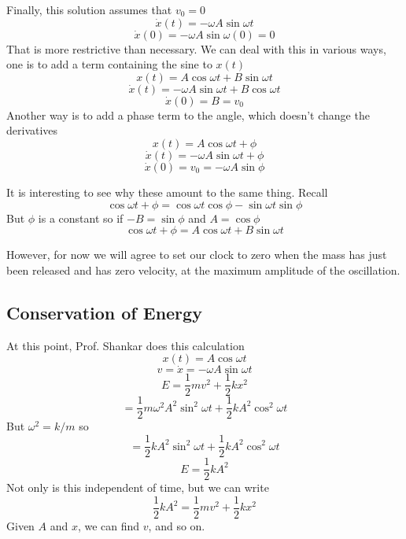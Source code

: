 \documentclass[11pt, oneside]{article}
\begin{document}
Finally, this solution assumes that $v_0 = 0$
\[ \dot{x}(t) = - \omega A \sin \omega t \]
\[ \dot{x}(0) = - \omega A \sin \omega (0) = 0 \]
That is more restrictive than necessary.  We can deal with this in various ways, one is to add a term containing the sine to $x(t)$
\[ x(t) =  A \cos \omega t + B \sin \omega t\]
\[ \dot{x}(t) =  - \omega A \sin \omega t + B \cos \omega t\]
\[ \dot{x}(0) = B = v_0 \]
Another way is to add a phase term to the angle, which doesn't change the derivatives
\[ x(t) =  A \cos \omega t + \phi \]
\[ \dot{x}(t) = - \omega A \sin \omega t + \phi \]
\[ \dot{x}(0) = v_0 = - \omega A \sin \phi \]

It is interesting to see why these amount to the same thing.  Recall
\[ \cos \omega t + \phi = \cos \omega t \cos \phi - \sin \omega t \sin \phi \]
But $\phi$ is a constant so if $-B = \sin \phi$ and $A = \cos \phi$
\[ \cos \omega t + \phi = A \cos \omega t + B \sin \omega t \]

However, for now we will agree to set our clock to zero when the mass has just been released and has zero velocity, at the maximum amplitude of the oscillation.

\subsection*{Conservation of Energy}
At this point, Prof. Shankar does this calculation
\[ x(t) = A \cos \omega t \]
\[ v = \dot{x} = - \omega A \sin \omega t \]
\[ E = \frac{1}{2}mv^2 + \frac{1}{2} kx^2 \]
\[ = \frac{1}{2}m \omega^2 A^2 \sin^2 \omega t + \frac{1}{2} k A^2 \cos^2 \omega t \]
But $\omega^2 = k/m$ so
\[ = \frac{1}{2}k A^2 \sin^2 \omega t + \frac{1}{2} k A^2 \cos^2 \omega t \]
\[ E = \frac{1}{2}k A^2 \]
Not only is this independent of time, but we can write
\[ \frac{1}{2}k A^2 = \frac{1}{2}mv^2 + \frac{1}{2} kx^2 \]
Given $A$ and $x$, we can find $v$, and so on.
\end{document}
